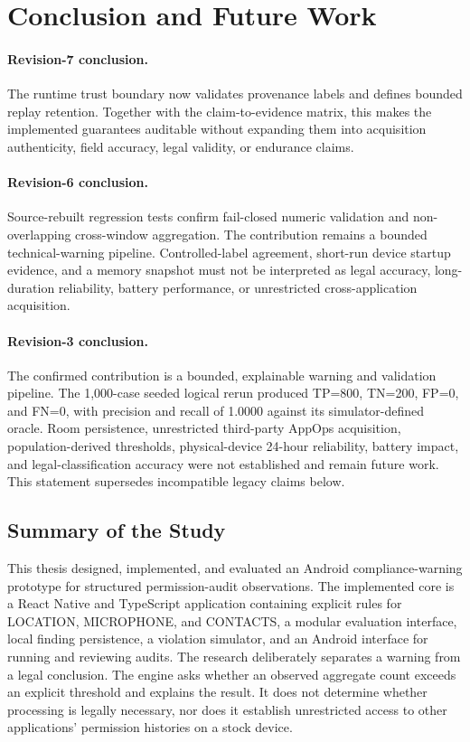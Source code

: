 \newpage
\section{Conclusion and Future Work}

\paragraph{Revision-7 conclusion.} The runtime trust boundary now validates provenance labels and defines bounded replay retention. Together with the claim-to-evidence matrix, this makes the implemented guarantees auditable without expanding them into acquisition authenticity, field accuracy, legal validity, or endurance claims.

\paragraph{Revision-6 conclusion.} Source-rebuilt regression tests confirm fail-closed numeric validation and non-overlapping cross-window aggregation. The contribution remains a bounded technical-warning pipeline. Controlled-label agreement, short-run device startup evidence, and a memory snapshot must not be interpreted as legal accuracy, long-duration reliability, battery performance, or unrestricted cross-application acquisition.

\paragraph{Revision-3 conclusion.} The confirmed contribution is a bounded, explainable warning and validation pipeline. The 1,000-case seeded logical rerun produced TP=800, TN=200, FP=0, and FN=0, with precision and recall of 1.0000 against its simulator-defined oracle. Room persistence, unrestricted third-party AppOps acquisition, population-derived thresholds, physical-device 24-hour reliability, battery impact, and legal-classification accuracy were not established and remain future work. This statement supersedes incompatible legacy claims below.

\subsection{Summary of the Study}

This thesis designed, implemented, and evaluated an Android compliance-warning prototype for structured permission-audit observations. The implemented core is a React Native and TypeScript application containing explicit rules for LOCATION, MICROPHONE, and CONTACTS, a modular evaluation interface, local finding persistence, a violation simulator, and an Android interface for running and reviewing audits. The research deliberately separates a warning from a legal conclusion. The engine asks whether an observed aggregate count exceeds an explicit threshold and explains the result. It does not determine whether processing is legally necessary, nor does it establish unrestricted access to other applications' permission histories on a stock device.

